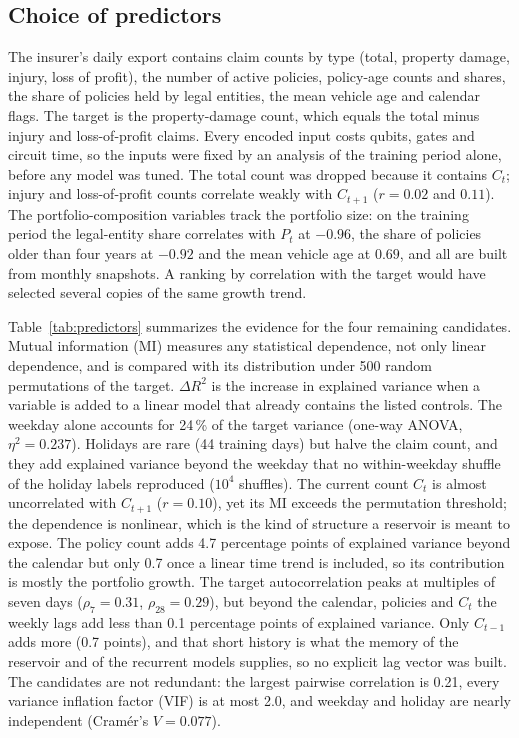 \documentclass[journal]{IEEEtran}
\begin{document}
\subsection{Choice of predictors}
\label{sec:predictors}
The insurer's daily export contains claim counts by type (total, property damage, injury, loss of profit), the number of active policies, policy-age counts and shares, the share of policies held by legal entities, the mean vehicle age and calendar flags. The target is the property-damage count, which equals the total minus injury and loss-of-profit claims. Every encoded input costs qubits, gates and circuit time, so the inputs were fixed by an analysis of the training period alone, before any model was tuned. The total count was dropped because it contains $C_t$; injury and loss-of-profit counts correlate weakly with $C_{t+1}$ ($r=0.02$ and $0.11$). The portfolio-composition variables track the portfolio size: on the training period the legal-entity share correlates with $P_t$ at $-0.96$, the share of policies older than four years at $-0.92$ and the mean vehicle age at $0.69$, and all are built from monthly snapshots. A ranking by correlation with the target would have selected several copies of the same growth trend.

Table~\ref{tab:predictors} summarizes the evidence for the four remaining candidates. Mutual information (MI) measures any statistical dependence, not only linear dependence, and is compared with its distribution under 500 random permutations of the target. $\Delta R^2$ is the increase in explained variance when a variable is added to a linear model that already contains the listed controls. The weekday alone accounts for 24\,\% of the target variance (one-way ANOVA, $\eta^2=0.237$). Holidays are rare (44 training days) but halve the claim count, and they add explained variance beyond the weekday that no within-weekday shuffle of the holiday labels reproduced ($10^4$ shuffles). The current count $C_t$ is almost uncorrelated with $C_{t+1}$ ($r=0.10$), yet its MI exceeds the permutation threshold; the dependence is nonlinear, which is the kind of structure a reservoir is meant to expose. The policy count adds 4.7 percentage points of explained variance beyond the calendar but only 0.7 once a linear time trend is included, so its contribution is mostly the portfolio growth. The target autocorrelation peaks at multiples of seven days ($\rho_7=0.31$, $\rho_{28}=0.29$), but beyond the calendar, policies and $C_t$ the weekly lags add less than 0.1 percentage points of explained variance. Only $C_{t-1}$ adds more (0.7 points), and that short history is what the memory of the reservoir and of the recurrent models supplies, so no explicit lag vector was built. The candidates are not redundant: the largest pairwise correlation is 0.21, every variance inflation factor (VIF) is at most 2.0, and weekday and holiday are nearly independent (Cram\'er's $V=0.077$).
\end{document}
